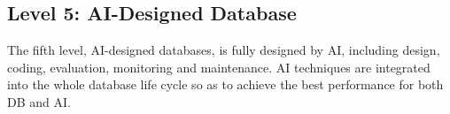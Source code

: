 




\subsection{Level 5: AI-Designed Database}
\label{subsec: designed}

The fifth level, AI-designed databases, is fully designed by AI, including design, coding, evaluation, monitoring and maintenance. AI techniques are  integrated into the whole database life cycle so as to achieve the best performance for both DB and AI.






















